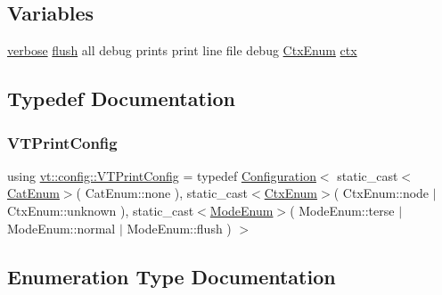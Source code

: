 \subsection*{Variables}
\begin{DoxyCompactItemize}
\item 
\hyperlink{namespacevt_1_1config_a724e99568632cc0fe9c456c2230270d0a9b54bf70f7b7fe7cfb6f3da0e167ae27}{verbose} \hyperlink{namespacevt_1_1config_a724e99568632cc0fe9c456c2230270d0a5c484f36b0f33ded7e640cc30fe5e725}{flush} all debug prints print line file debug \hyperlink{namespacevt_1_1config_a46e57c33bee1b9f1fa95455af86d80e0}{Ctx\+Enum} \hyperlink{namespacevt_1_1config_a0551245b6b893932b95aaf8eac94eed1}{ctx}
\end{DoxyCompactItemize}


\subsection{Typedef Documentation}
\mbox{\label{namespacevt_1_1config_a2fcb16923fa0d26d60741f06f2933983}} 
\subsubsection{\texorpdfstring{V\+T\+Print\+Config}{VTPrintConfig}}
{\footnotesize\ttfamily using \hyperlink{namespacevt_1_1config_a2fcb16923fa0d26d60741f06f2933983}{vt\+::config\+::\+V\+T\+Print\+Config} = typedef \hyperlink{structvt_1_1config_1_1_configuration}{Configuration}$<$ static\+\_\+cast$<$\hyperlink{namespacevt_1_1config_a6bd1d6215bda0d8ca02811798399f689}{Cat\+Enum}$>$( Cat\+Enum\+::none ), static\+\_\+cast$<$\hyperlink{namespacevt_1_1config_a46e57c33bee1b9f1fa95455af86d80e0}{Ctx\+Enum}$>$( Ctx\+Enum\+::node $\vert$ Ctx\+Enum\+::unknown ), static\+\_\+cast$<$\hyperlink{namespacevt_1_1config_a724e99568632cc0fe9c456c2230270d0}{Mode\+Enum}$>$( Mode\+Enum\+::terse $\vert$ Mode\+Enum\+::normal $\vert$ Mode\+Enum\+::flush ) $>$}



\subsection{Enumeration Type Documentation}
\mbox{\label{namespacevt_1_1config_a6bd1d6215bda0d8ca02811798399f689}} 
